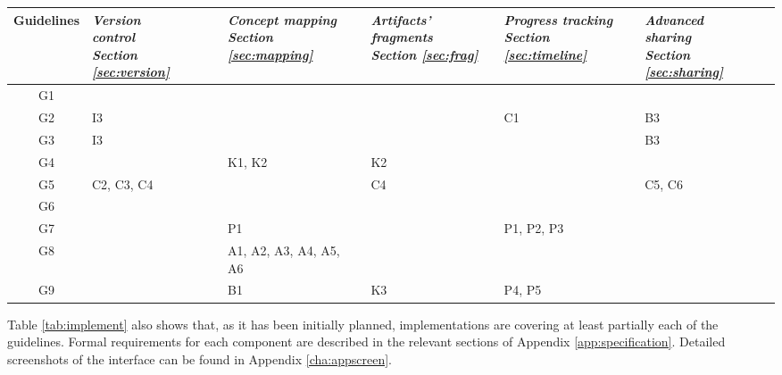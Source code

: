 \begin{center} \small
    \tablelasttail{\hline} 
    \begin{supertabular}{| c || p{2cm} | p{2cm} | p{2cm} | p{2cm} | p{2cm} |}
     \textbf{Guidelines} & 
     \textit{Version \newline control \newline Section \ref{sec:version}} & 
     \textit{Concept mapping \newline Section \ref{sec:mapping}} & 
     \textit{Artifacts' fragments \newline Section \ref{sec:frag}} & 
     \textit{Progress tracking \newline Section \ref{sec:timeline}} & 
     \textit{Advanced \newline sharing \newline Section \ref{sec:sharing}} \\
     \hline \hline
      G1 & & & & & \\ \hline
     G2 & I3 & & & C1 & B3\\ \hline
     G3 & I3 & & & & B3 \\ \hline
     G4 & & K1, K2 & K2 & & \\ \hline
     G5 & C2, C3, C4 & & C4 & & C5, C6 \\ \hline
      G6 & & & & & \\ \hline
     G7 & & P1 & & P1, P2, P3 & \\ \hline
     G8 & & A1, A2, A3, \newline A4, A5, A6 & & & \\ \hline
     G9 & & B1 & K3 & P4, P5 & \\ \hline
    \end{supertabular}
    \label{tab:implement}
\end{center}

Table \ref{tab:implement} also shows that, as it has been initially planned,
implementations are covering at least partially each of the guidelines. Formal
requirements for each component are described in the relevant sections of
Appendix \ref{app:specification}. Detailed screenshots of the interface can be
found in Appendix \ref{cha:appscreen}.

